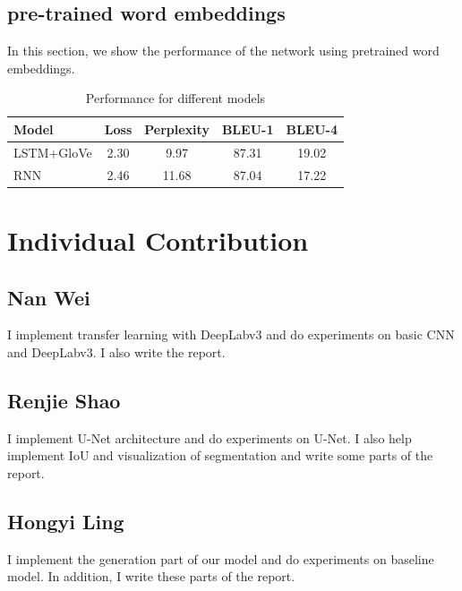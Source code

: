 \documentclass{article} %
\begin{document}
\subsection{pre-trained word embeddings}
In this section, we show the performance of the network using pretrained word embeddings.


\begin{table}[!htb]
    \centering
    \begin{tabular}{l|c|c|c|c}
        \hline
        Model & Loss & Perplexity & BLEU-1 & BLEU-4 \\
		\hline
        LSTM+GloVe& 2.30 & 9.97 &87.31&19.02\\\hline
        RNN & 2.46 & 11.68 & 87.04 & 17.22 \\
	    \hline
    \end{tabular}
    \caption{Performance for different models}
    \label{acc}
\end{table}

\section{Individual Contribution}

\subsection*{Nan Wei}
I implement transfer learning with DeepLabv3 and do experiments on basic CNN and DeepLabv3. I also write the report.

\subsection*{Renjie Shao}
I implement U-Net architecture and do experiments on U-Net. I also help implement IoU and visualization of segmentation and write some parts of the report.
\subsection*{Hongyi Ling}
I implement the generation part of our model and do experiments on baseline model.  In addition, I write these parts of the report.



\end{document}
